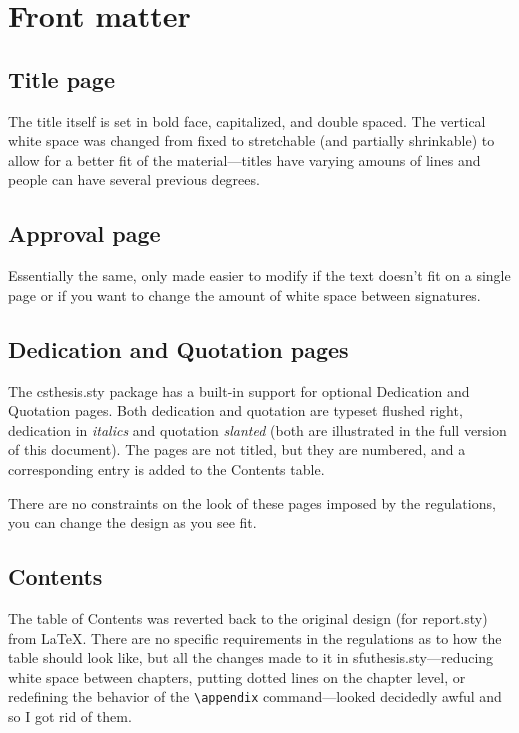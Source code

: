 \section{Front matter}

\subsection{Title page}

The title itself is set in bold face, capitalized, and double
spaced. The vertical white space was changed from fixed to stretchable
(and partially shrinkable) to allow for a better fit of the
material---titles have varying amouns of lines and people can have
several previous degrees.

\subsection{Approval page}

Essentially the same, only made easier to modify if the text doesn't
fit on a single page or if you want to change the amount of white
space between signatures.

\subsection{Dedication and Quotation pages}

The \textsf{csthesis.sty}
package has a built-in support for optional Dedication and Quotation
pages. Both dedication and
quotation are typeset flushed right, dedication in
\textit{italics} and quotation \textsl{slanted} (both are illustrated
in the full version of this document). The pages are not titled, but
they are numbered, and a corresponding entry is added to the Contents
table.

There are no constraints on the look of these pages imposed by the
regulations, you can change the design as
you see fit.

\subsection{Contents}
\label{cont}

The table of Contents was reverted back to the original design (for
\textsf{report.sty}) from \LaTeX. There are no specific requirements
in the regulations as to how the table
should look like, but all the changes made to it in
\textsf{sfuthesis.sty}---reducing
white space between chapters, putting dotted lines on the chapter
level, or redefining the behavior of the \verb+\appendix+%
command---looked decidedly awful and so I got rid of them.


